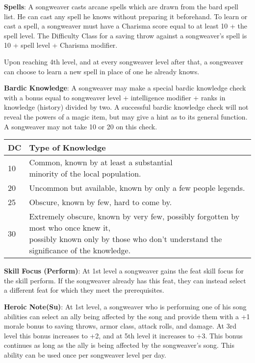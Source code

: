 \textbf{Spells}: A songweaver casts arcane spells which are drawn from the bard spell list. He can cast any spell he knows without preparing it beforehand. To learn or cast a spell, a songweaver must have a Charisma score equal to at least 10 + the spell level. The Difficulty Class for a saving throw against a songweaver's spell is 10 + spell level + Charisma modifier.

Upon reaching 4th level, and at every songweaver level after that, a songweaver can choose to learn a new spell in place of one he already knows. 

\textbf{Bardic Knowledge}: A songweaver may make a special bardic knowledge check with a bonus equal to songweaver level + intelligence modifier + ranks in knowledge (history) divided by two. A successful bardic knowledge check will not reveal the powers of a magic item, but may give a hint as to its general function. A songweaver may not take 10 or 20 on this check.

\begin{center}
\begin{adjustwidth}{-4cm}{}
\begin{small}
\begin{tabular}{| l | l |}
\hline
DC &Type of Knowledge \\
\hline
10 &\makecell{Common, known by at least a substantial\\ minority of the local population.} \\
20 &Uncommon but available, known by only a few people legends. \\
25 &Obscure, known by few, hard to come by. \\
30 &\makecell{Extremely obscure, known by very few, possibly forgotten by most who once knew it,\\ possibly known only by those who don't understand the significance of the knowledge.} \\
\hline
\end{tabular}
\end{small}
\end{adjustwidth}
\end{center}

\textbf{Skill Focus (Perform)}: At 1st level a songweaver gains the feat skill focus for the skill perform. If the songweaver already has this feat, they can instead select a different feat for which they meet the prerequisites.

\textbf{Heroic Note(Su)}: At 1st level, a songweaver who is performing one of his song abilities can select an ally being affected by the song and provide them with a +1 morale bonus to saving throws, armor class, attack rolls, and damage. At 3rd level this bonus increases to +2, and at 5th level it increases to +3. This bonus continues as long as the ally is being affected by the songweaver's song. This ability can be used once per songweaver level per day.

